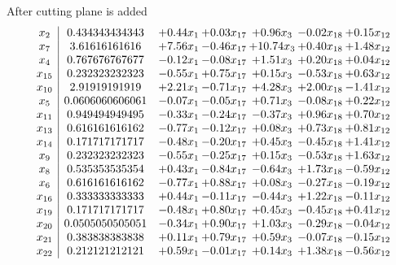\documentclass[8pt]{article}
\begin{document}
 After cutting plane is added 
\[\begin{array}{c| c c@{\hskip 2pt} c@{\hskip 2pt} c@{\hskip 2pt} c@{\hskip 2pt} c@{\hskip 2pt} }
 x_{2}   &  0.434343434343 & +  0.44 x_{1} & +  0.03 x_{17} & +  0.96 x_{3} & -0.02 x_{18} & +  0.15 x_{12}\\
 x_{7}   &  3.61616161616 & +  7.56 x_{1} & -0.46 x_{17} & + 10.74 x_{3} & +  0.40 x_{18} & +  1.48 x_{12}\\
 x_{4}   &  0.767676767677 & -0.12 x_{1} & -0.08 x_{17} & +  1.51 x_{3} & +  0.20 x_{18} & +  0.04 x_{12}\\
 x_{15}   &  0.232323232323 & -0.55 x_{1} & +  0.75 x_{17} & +  0.15 x_{3} & -0.53 x_{18} & +  0.63 x_{12}\\
 x_{10}   &  2.91919191919 & +  2.21 x_{1} & -0.71 x_{17} & +  4.28 x_{3} & +  2.00 x_{18} & -1.41 x_{12}\\
 x_{5}   &  0.0606060606061 & -0.07 x_{1} & -0.05 x_{17} & +  0.71 x_{3} & -0.08 x_{18} & +  0.22 x_{12}\\
 x_{11}   &  0.949494949495 & -0.33 x_{1} & -0.24 x_{17} & -0.37 x_{3} & +  0.96 x_{18} & +  0.70 x_{12}\\
 x_{13}   &  0.616161616162 & -0.77 x_{1} & -0.12 x_{17} & +  0.08 x_{3} & +  0.73 x_{18} & +  0.81 x_{12}\\
 x_{14}   &  0.171717171717 & -0.48 x_{1} & -0.20 x_{17} & +  0.45 x_{3} & -0.45 x_{18} & +  1.41 x_{12}\\
 x_{9}   &  0.232323232323 & -0.55 x_{1} & -0.25 x_{17} & +  0.15 x_{3} & -0.53 x_{18} & +  1.63 x_{12}\\
 x_{8}   &  0.535353535354 & +  0.43 x_{1} & -0.84 x_{17} & -0.64 x_{3} & +  1.73 x_{18} & -0.59 x_{12}\\
 x_{6}   &  0.616161616162 & -0.77 x_{1} & +  0.88 x_{17} & +  0.08 x_{3} & -0.27 x_{18} & -0.19 x_{12}\\
 x_{16}   &  0.333333333333 & +  0.44 x_{1} & -0.11 x_{17} & -0.44 x_{3} & +  1.22 x_{18} & -0.11 x_{12}\\
 x_{19}   &  0.171717171717 & -0.48 x_{1} & +  0.80 x_{17} & +  0.45 x_{3} & -0.45 x_{18} & +  0.41 x_{12}\\
 x_{20}   &  0.0505050505051 & -0.34 x_{1} & +  0.90 x_{17} & +  1.03 x_{3} & -0.29 x_{18} & -0.04 x_{12}\\
 x_{21}   &  0.383838383838 & +  0.11 x_{1} & +  0.79 x_{17} & +  0.59 x_{3} & -0.07 x_{18} & -0.15 x_{12}\\
 x_{22}   &  0.212121212121 & +  0.59 x_{1} & -0.01 x_{17} & +  0.14 x_{3} & +  1.38 x_{18} & -0.56 x_{12}\\

\end{array}\]
\end{document}
